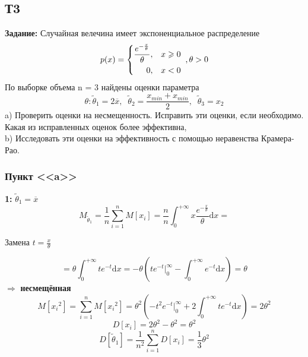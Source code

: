     \subsection{Т3}

\textbf{Задание:}
Случайная велечина имеет экспоненциальное распределение
\begin{equation*}
    p(x) = \left\{\begin{aligned}
        \frac{e^{-\frac{x}{\theta}}}{\theta}, \;\;\;x\geqslant0\\
        0, \;\;\;x<0
\end{aligned}\right. \\
\;,\theta > 0
\end{equation*}
По выборке объема n = 3 найдены оценки параметра \\
\begin{equation*}
    \theta : \tilde\theta_1 = 2\overline{x}, \;\;
             \tilde\theta_2 = \frac{x_{min} + x_{min}}{2}, \;\;
             \tilde\theta_3 = x_2
\end{equation*}
a) Проверить оценки на несмещенность. Исправить эти оценки, если необходимо. Какая из исправленных оценок более эффективна,\\
b) Исследовать эти оценки на эффективность с помощью неравенства Крамера-Рао.

\subsubsection{Пункт <<a>>}
\vspace{1.5mm}
\textbf{1:} 
$\tilde\theta_1 = \overline{x}$ \\
\begin{equation*}
    M_{\tilde\theta_1} = \frac{1}{n}\sum_{i=1}^{n}M[x_i]
    = \frac{n}{n}\int_{0}^{+\infty}x\frac{e^{-\frac{x}{\theta}}}{\theta}\mathrm{d}x = 
\end{equation*}
\begin{center}
    Замена $t = \frac{x}{\theta}$
\end{center}
\begin{equation*}
    = \theta\int_{0}^{+\infty}te^{-t}\mathrm{d}x 
    = -\theta\left(te^{-t}\bigg|_{0}^{\infty} - \int_{0}^{+\infty}e^{-t}\mathrm{d}x\right)
    = \theta 
\end{equation*}
$\Rightarrow$ \textbf{несмещённая}
\vspace{1.5mm}
\begin{equation*}
    M[{x_i}^2] = \sum_{i=1}^{n}M[{x_i}^2] 
    = \theta^2\left(-t^2e^{-t}\bigg|_{0}^{\infty} + 2\int_{0}^{+\infty}te^{-t}\mathrm{d}x\right)
    = 2\theta^2
\end{equation*}
\vspace{1.5mm}
\begin{equation*}
    D[x_i] = 2\theta^2 - \theta^2
    = \theta^2
\end{equation*}
\vspace{1.5mm}
\begin{equation*}
    D[{\tilde\theta_1}] = \frac{1}{n^2}\sum_{i=1}^{n}D[x_i]
    = \frac{1}{3}\theta^2
\end{equation*}
\vspace{2.5mm}

